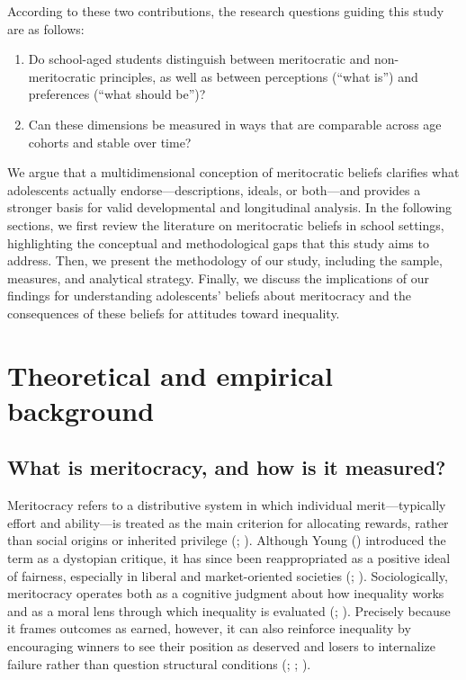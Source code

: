 \documentclass[
  13pt,
]{article}
\begin{document}
According to these two contributions, the research questions guiding
this study are as follows:

\begin{enumerate}
\def\labelenumi{(\arabic{enumi})}
\item
  Do school-aged students distinguish between meritocratic and
  non-meritocratic principles, as well as between perceptions (``what
  is'') and preferences (``what should be'')?
\item
  Can these dimensions be measured in ways that are comparable across
  age cohorts and stable over time?
\end{enumerate}

We argue that a multidimensional conception of meritocratic beliefs
clarifies what adolescents actually endorse---descriptions, ideals, or
both---and provides a stronger basis for valid developmental and
longitudinal analysis. In the following sections, we first review the
literature on meritocratic beliefs in school settings, highlighting the
conceptual and methodological gaps that this study aims to address.
Then, we present the methodology of our study, including the sample,
measures, and analytical strategy. Finally, we discuss the implications
of our findings for understanding adolescents' beliefs about meritocracy
and the consequences of these beliefs for attitudes toward inequality.

\section{Theoretical and empirical
background}\label{theoretical-and-empirical-background}

\subsection{What is meritocracy, and how is it
measured?}\label{what-is-meritocracy-and-how-is-it-measured}

Meritocracy refers to a distributive system in which individual
merit---typically effort and ability---is treated as the main criterion
for allocating rewards, rather than social origins or inherited
privilege (;
). Although Young
() introduced the term as a
dystopian critique, it has since been reappropriated as a positive ideal
of fairness, especially in liberal and market-oriented societies
(;
).
Sociologically, meritocracy operates both as a cognitive judgment about
how inequality works and as a moral lens through which inequality is
evaluated (; ).
Precisely because it frames outcomes as earned, however, it can also
reinforce inequality by encouraging winners to see their position as
deserved and losers to internalize failure rather than question
structural conditions
(;
;
).
\end{document}
